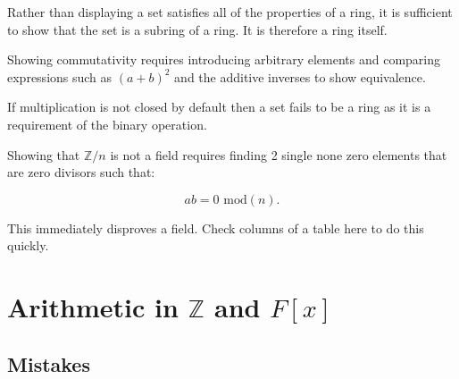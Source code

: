 \begin{method}
  Rather than displaying a set satisfies all of the properties of a ring, it is   sufficient to show that the set is a subring of a ring. It is therefore a ring itself.
\end{method}


\begin{method}
  Showing commutativity requires introducing arbitrary elements and comparing expressions such as $(a+b)^2$ and the additive inverses to show equivalence.
\end{method}

\begin{method}
  If multiplication is not closed by default then a set fails to be a ring as it is a requirement of the binary operation.
\end{method}

\begin{method}
  Showing that $\mathbb{Z} / n$ is not a field requires finding 2 single none zero elements that are zero divisors such that:

  \[ab = 0 \text{ mod} (n).\]

\noindent This immediately disproves a field. Check columns of a table here to do this quickly.

\end{method}


\section{Arithmetic in \(\mathbb{Z}\) and \(F[x]\)}

\subsection{Mistakes}

